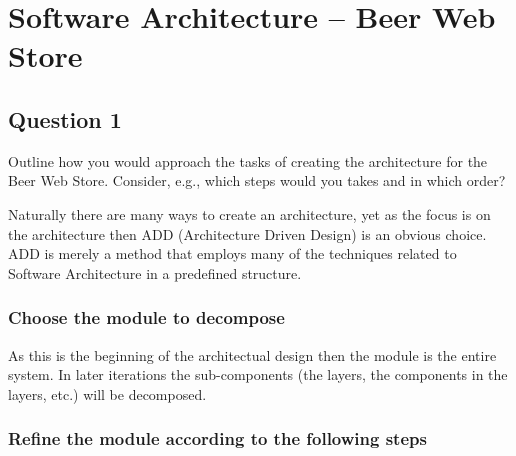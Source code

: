 \section{Software Architecture -- Beer Web Store}


\subsection{Question 1}
\begin{question}
Outline how you would approach the tasks of creating the
architecture for the Beer Web Store. Consider, e.g., which steps
would you takes and in which order?
\end{question}

Naturally there are many ways to create an architecture, yet as the focus is on the architecture then ADD (Architecture Driven Design) is an obvious choice. ADD is merely a method that employs many of the techniques related to Software Architecture in a predefined structure.

\subsubsection{Choose the module to decompose}
As this is the beginning of the architectual design then the module is the entire system. In later iterations the sub-components (the layers, the components in the layers, etc.) will be decomposed.

\subsubsection{Refine the module according to the following steps}


